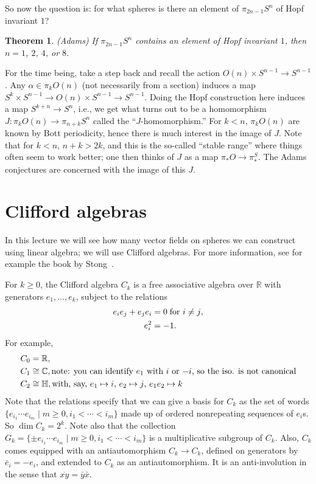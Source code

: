 \documentclass{article}
\newcommand{\C}{\mathbb{C}}
\newcommand{\R}{\mathbb{R}}
\newtheorem{thm}{Theorem}[section]
\begin{document}
So now the question is: for what spheres is there an element of $\pi_{2n-1} S^n$ of Hopf invariant $1$?
\begin{thm}(Adams) %
If $\pi_{2n-1} S^n$ contains an element of Hopf invariant $1$, then $n = 1$, $2$, $4$, or $8$.
\end{thm}
For the time being, take a step back and recall the action $O(n) \times S^{n-1} \to S^{n-1}$.  Any $\alpha \in \pi_k O(n)$ (not necessarily from a section) induces a map $S^k \times S^{n-1} \to O(n) \times S^{n-1} \to S^{n-1}$.  Doing the Hopf construction here induces a map $S^{k+n} \to S^n$, i.e., we get what turns out to be a homomorphism $J: \pi_k O(n) \to \pi_{n+k} S^n$ called the ``$J$-homomorphism.''  For $k < n$, $\pi_k O(n)$ are known by Bott periodicity, hence there is much interest in the image of $J$.  Note that for $k < n$, $n + k > 2k$, and this is the so-called ``stable range'' where things often seem to work better; one then thinks of $J$ as a map $\pi_* O \to \pi_*^S$.  The Adams conjectures are concerned with the image of this $J$. %


\section{Clifford algebras} %

In this lecture we will see how many vector fields on spheres we can construct using linear algebra; we will use Clifford algebras.  For more information, see for example the book by Stong~\cite{Stong}.

For $k \ge 0$, the Clifford algebra $C_k$ is a free associative algebra over $\R$ with generators $e_1, \ldots, e_k$, subject to the relations
\begin{align*}
e_i e_j + e_j e_i & = 0 \hbox{\;for $i \ne j$}, \\
e_i^2 & = -1.
\end{align*}
For example,
\begin{align*}
C_0 & = \R, \\
C_1 & \cong \C, \hbox{note: you can identify $e_1$ with $i$ or $-i$, so the iso. is not canonical} \\
C_2 & \cong \mathbb{H}, \hbox{with, say, $e_1 \mapsto i$, $e_2 \mapsto j$, $e_1 e_2 \mapsto k$}
\end{align*}
Note that the relations specify that we can give a basis for $C_k$ as the set of words $\{e_{i_1} \cdots e_{i_m} \mid m \ge 0, i_1 < \cdots < i_m\}$ made up of ordered nonrepeating sequences of $e_i$s.  So $\dim C_k = 2^k$.  Note also that the collection $G_k = \{ \pm e_{i_1} \cdots e_{i_m} \mid m \ge 0, i_1 < \cdots < i_m\}$ is a multiplicative subgroup of $C_k$.  Also, $C_k$ comes equipped with an antiautomorphism $C_k \to C_k$, defined on generators by $\bar e_i = -e_i$, and extended to $C_k$ as an antiautomorphism.  It is an anti-involution in the sense that $\overline{xy} = \bar y \bar x$.
\end{document}
